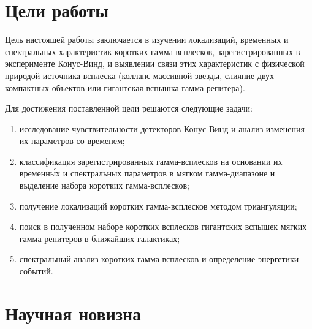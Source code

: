 \section*{Цели работы}
Цель настоящей работы заключается в изучении локализаций, временных и спектральных характеристик 
коротких гамма-всплесков, зарегистрированных в эксперименте Конус-Винд, и выявлении 
связи этих характеристик с физической природой источника всплеска 
(коллапс массивной звезды, слияние двух компактных объектов или гигантская вспышка гамма-репитера).

Для достижения поставленной цели решаются следующие задачи:
\begin{enumerate}
\item исследование чувствительности детекторов Конус-Винд и анализ изменения их параметров со временем;
\item классификация зарегистрированных гамма-всплесков на основании их временн\'{ы}х 
и спектральных параметров в мягком гамма-диапазоне и выделение набора коротких гамма-всплесков; 
\item получение локализаций коротких гамма-всплесков методом триангуляции; 
\item поиск в полученном наборе коротких всплесков гигантских 
вспышек мягких гамма-репитеров в ближайших галактиках;
\item спектральный анализ коротких гамма-всплесков и определение энергетики событий.
\end{enumerate}

\section*{Научная новизна}

